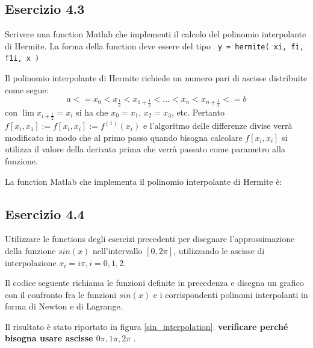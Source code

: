 	\subsection {Esercizio 4.3}
Scrivere una function Matlab che implementi il calcolo del polinomio interpolante di Hermite. La forma della function deve essere del tipo \texttt{ y = hermite( xi, fi, f1i, x ) }

Il polinomio interpolante di Hermite richiede un numero pari di ascisse distribuite come segue: 
\begin{equation}
	a <= x_0 < x_{\frac{1}{2}} < x_{1+\frac{1}{2}} < ... < x_n < x_{n+\frac{1}{2}} <= b
\end{equation}
con $\lim{x_{i+\frac{1}{2}} = x_i}$ si ha che $x_0 = x_1$, $x_2=x_3$, etc. Pertanto $f[x_i, x_1]:=f[x_i, x_i]:=f^{(1)}(x_i)$ e l'algoritmo delle differenze divise verrà modificato in modo che al primo passo quando bisogna calcolare $f[x_i, x_i]$ si utilizza il valore della derivata prima che verrà passato come parametro alla funzione.

La function Matlab che implementa il polinomio interpolante di Hermite è:




	\subsection {Esercizio 4.4}
Utilizzare le functions degli esercizi precedenti per disegnare l'approssimazione della funzione $sin(x)$  nell'intervallo $[0, 2\pi]$, utilizzando le ascisse di interpolazione $x_{i}=i\pi, i=0,1,2$.

Il codice seguente richiama le funzioni definite in precedenza e disegna un grafico con il confronto fra le funzioni $sin(x)$ e i corrispondenti polinomi interpolanti in forma di Newton e di Lagrange.

Il risultato è stato riportato in figura \ref{sin_interpolation}. \textbf{ verificare perché bisogna usare ascisse $0\pi, 1\pi, 2\pi$ }.

